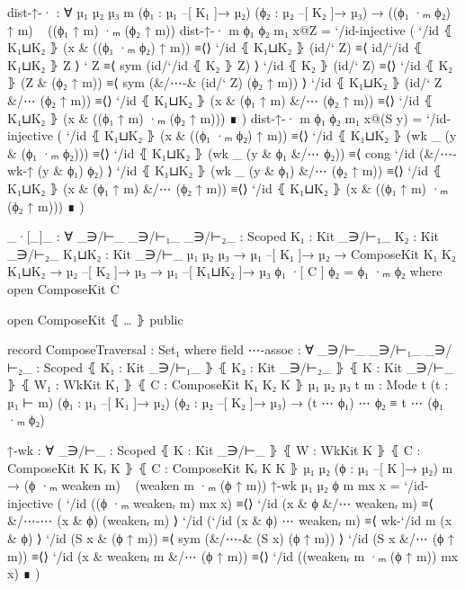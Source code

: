 \begin{code}
      dist-↑-· :
        ∀ {µ₁} {µ₂} {µ₃} m
          (ϕ₁ : µ₁ –[ K₁ ]→ µ₂)
          (ϕ₂ : µ₂ –[ K₂ ]→ µ₃)
        → ((ϕ₁ ·ₘ ϕ₂) ↑ m) ~ ((ϕ₁ ↑ m) ·ₘ (ϕ₂ ↑ m))
      dist-↑-· m ϕ₁ ϕ₂ m₁ x@Z = `/id-injective (
        `/id ⦃ K₁⊔K₂ ⦄ (x & ((ϕ₁ ·ₘ ϕ₂) ↑ m))       ≡⟨⟩
        `/id ⦃ K₁⊔K₂ ⦄ (id/` Z)                     ≡⟨ id/`/id ⦃ K₁⊔K₂ ⦄ Z ⟩
        ` Z                                         ≡⟨ sym (id/`/id ⦃ K₂ ⦄ Z) ⟩
        `/id ⦃ K₂ ⦄ (id/` Z)                        ≡⟨⟩
        `/id ⦃ K₂ ⦄ (Z & (ϕ₂ ↑ m))                  ≡⟨ sym (&/⋯-& (id/` Z) (ϕ₂ ↑ m)) ⟩
        `/id ⦃ K₁⊔K₂ ⦄ (id/` Z &/⋯ (ϕ₂ ↑ m))        ≡⟨⟩
        `/id ⦃ K₁⊔K₂ ⦄ (x & (ϕ₁ ↑ m) &/⋯ (ϕ₂ ↑ m))  ≡⟨⟩
        `/id ⦃ K₁⊔K₂ ⦄ (x & ((ϕ₁ ↑ m) ·ₘ (ϕ₂ ↑ m))) ∎
        )
      dist-↑-· m ϕ₁ ϕ₂ m₁ x@(S y) = `/id-injective (
        `/id ⦃ K₁⊔K₂ ⦄ (x & ((ϕ₁ ·ₘ ϕ₂) ↑ m))       ≡⟨⟩
        `/id ⦃ K₁⊔K₂ ⦄ (wk _ (y & (ϕ₁ ·ₘ ϕ₂)))      ≡⟨⟩
        `/id ⦃ K₁⊔K₂ ⦄ (wk _ (y & ϕ₁ &/⋯ ϕ₂))       ≡⟨ cong `/id (&/⋯-wk-↑ (y & ϕ₁) ϕ₂) ⟩
        `/id ⦃ K₁⊔K₂ ⦄ (wk _ (y & ϕ₁) &/⋯ (ϕ₂ ↑ m)) ≡⟨⟩
        `/id ⦃ K₁⊔K₂ ⦄ (x & (ϕ₁ ↑ m) &/⋯ (ϕ₂ ↑ m))  ≡⟨⟩
        `/id ⦃ K₁⊔K₂ ⦄ (x & ((ϕ₁ ↑ m) ·ₘ (ϕ₂ ↑ m))) ∎
        )

    _·[_]_ :
      ∀ {_∋/⊢_ _∋/⊢₁_ _∋/⊢₂_ : Scoped} {K₁ : Kit _∋/⊢₁_} {K₂ : Kit _∋/⊢₂_} {K₁⊔K₂ : Kit _∋/⊢_} {µ₁ µ₂ µ₃}
      → µ₁ –[ K₁ ]→ µ₂ → ComposeKit K₁ K₂ K₁⊔K₂ → µ₂ –[ K₂ ]→ µ₃ → µ₁ –[ K₁⊔K₂ ]→ µ₃
    ϕ₁ ·[ C ] ϕ₂ = ϕ₁ ·ₘ ϕ₂ where open ComposeKit C

    open ComposeKit ⦃ … ⦄ public

    record ComposeTraversal : Set₁ where
      field
        ⋯-assoc :
          ∀ {_∋/⊢_ _∋/⊢₁_ _∋/⊢₂_ : Scoped}
            ⦃ K₁ : Kit _∋/⊢₁_ ⦄ ⦃ K₂ : Kit _∋/⊢₂_ ⦄ ⦃ K : Kit _∋/⊢_ ⦄
            ⦃ W₁ : WkKit K₁ ⦄ ⦃ C : ComposeKit K₁ K₂ K ⦄
            {µ₁ µ₂ µ₃ t} {m : Mode t}
            (t : µ₁ ⊢ m) (ϕ₁ : µ₁ –[ K₁ ]→ µ₂) (ϕ₂ : µ₂ –[ K₂ ]→ µ₃)
          → (t ⋯ ϕ₁) ⋯ ϕ₂ ≡ t ⋯ (ϕ₁ ·ₘ ϕ₂)

      ↑-wk :
        ∀ {_∋/⊢_ : Scoped} ⦃ K : Kit _∋/⊢_ ⦄ ⦃ W : WkKit K ⦄
           ⦃ C : ComposeKit K Kᵣ K ⦄ ⦃ C : ComposeKit Kᵣ K K ⦄ 
          {µ₁ µ₂} (ϕ : µ₁ –[ K ]→ µ₂) m
        → (ϕ ·ₘ weaken m) ~ (weaken m ·ₘ (ϕ ↑ m))
      ↑-wk {µ₁} {µ₂} ϕ m mx x = `/id-injective (
          `/id ((ϕ ·ₘ weakenᵣ m) mx x)       ≡⟨⟩
          `/id (x & ϕ &/⋯ weakenᵣ m)         ≡⟨ &/⋯-⋯ (x & ϕ) (weakenᵣ m) ⟩
          `/id (`/id (x & ϕ) ⋯ weakenᵣ m)    ≡⟨ wk-`/id m (x & ϕ) ⟩
          `/id (S x & (ϕ ↑ m))               ≡⟨ sym (&/⋯-& (S x) (ϕ ↑ m)) ⟩
          `/id (S x &/⋯ (ϕ ↑ m))             ≡⟨⟩
          `/id (x & weakenᵣ m &/⋯ (ϕ ↑ m))   ≡⟨⟩
          `/id ((weakenᵣ m ·ₘ (ϕ ↑ m)) mx x) ∎
        )


\end{code}
